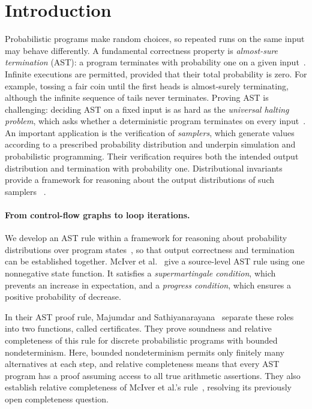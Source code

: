\section{Introduction}
\label{sec:intro}

Probabilistic programs make random choices, so repeated runs on the same
input may behave differently. A fundamental correctness property is
\emph{almost-sure termination} (AST): a program terminates with probability
one on a given input~\cite{SahebDjahromi1978}. Infinite executions are permitted, provided
that their total probability is zero. For example, tossing a fair coin
until the first heads is almost-surely terminating, although the infinite
sequence of tails never terminates. Proving AST is challenging: deciding
AST on a fixed input is as hard as the \emph{universal halting problem},
which asks whether a deterministic program terminates on every
input~\cite{KaminskiKM2019}.
An important application is the verification of \emph{samplers}, which
generate values according to a prescribed probability distribution and
underpin simulation and probabilistic programming. Their verification requires both the intended output distribution
and termination with probability one.
Distributional invariants provide a framework for reasoning about
the output distributions of such samplers%
~\cite{zilken2026verifyingsamplingalgorithmsdistributional}.

\paragraph{From control-flow graphs to loop iterations.}
We develop an AST rule within a framework for reasoning about probability
distributions over program states~\cite{zilken2026verifyingsamplingalgorithmsdistributional},
so that output correctness and termination can be established together.
McIver et al.~\cite{10.1145/3158121} give a source-level AST rule using one
nonnegative state function. It satisfies a \emph{supermartingale condition},
which prevents an increase in expectation, and a \emph{progress condition},
which ensures a positive probability of decrease.

In their AST proof rule, Majumdar and
Sathiyanarayana~\cite{DBLP:journals/pacmpl/MajumdarS25}
separate these roles into two functions, called certificates.
They prove soundness and relative completeness of this rule for
discrete probabilistic programs with bounded nondeterminism. Here, bounded nondeterminism permits only
finitely many alternatives at each step, and relative completeness means
that every AST program has a proof assuming access to all true arithmetic
assertions. They also establish relative completeness of McIver et al.'s
rule~\cite{10.1145/3158121}, resolving its previously open completeness
question.

